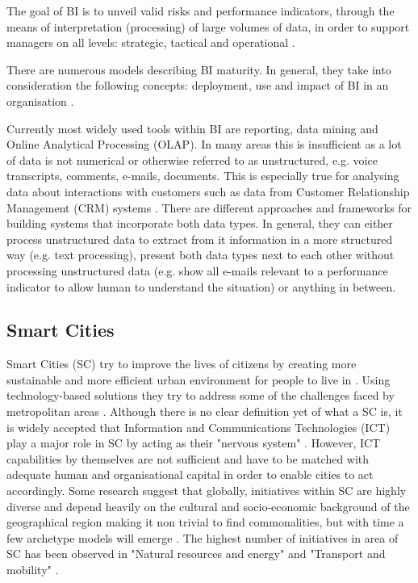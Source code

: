 The goal of BI is to unveil valid risks and performance indicators, through the means of interpretation (processing) of large volumes of data, in order to support managers on all levels: strategic, tactical and operational \citep{baars2008management}.

There are numerous models describing BI maturity. In general, they take into consideration the following concepts: deployment, use and impact of BI in an organisation \citep{Lahrmann2011}.

Currently most widely used tools within BI are reporting, data mining and Online Analytical Processing (OLAP). In many areas this is insufficient as a lot of data is not numerical or otherwise referred to as unstructured, e.g. voice transcripts, comments, e-mails, documents. This is especially true for analysing data about interactions with customers such as data from Customer Relationship Management (CRM) systems \citep{baars2008management}. There are different approaches and frameworks for building systems that incorporate both data types. In general, they can either process unstructured data to extract from it information in a more structured way (e.g. text processing), present both data types next to each other without processing unstructured data (e.g. show all e-mails relevant to a performance indicator to allow human to understand the situation) or anything in between.

		\subsection{Smart Cities}
		
Smart Cities (SC) try to improve the lives of citizens by creating more sustainable and more efficient urban environment for people to live in \citep{geertman2015planning}. Using technology-based solutions they try to address some of the challenges faced by metropolitan areas \citep{Neirotti2014}. Although there is no clear definition yet of what a SC is, it is widely accepted that Information and Communications Technologies (ICT) play a major role in SC by acting as their "nervous system" \citep{Neirotti2014, geertman2015planning}. However, ICT capabilities by themselves are not sufficient and have to be matched with adequate human and organisational capital in order to enable cities to act accordingly.  Some research suggest that globally, initiatives within SC are highly diverse and depend heavily on the cultural and socio-economic background of the geographical region making it non trivial to find commonalities, but with time a few archetype models will emerge \citep{Neirotti2014, geertman2015planning}. The highest number of initiatives in area of SC has been observed in "Natural resources and energy" and "Transport and mobility" \citep{Neirotti2014}.

